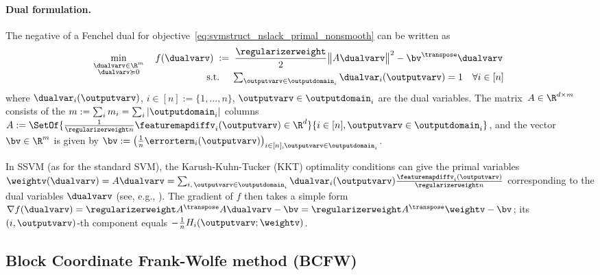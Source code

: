 \documentclass{article}
\begin{document}
\paragraph{Dual formulation.} The negative of a Fenchel dual for objective~\eqref{eq:svmstruct_nslack_primal_nonsmooth} can be written as\vspace{-1mm}
\begin{align}
    \label{eq:svmstruct_nslack_dual} %
    \min_{\substack{ \dualvarv\in\R^{m} \\  \dualvarv \succcurlyeq 0}} \quad  f(\dualvarv) \;:=&  \;\;
    \frac{\regularizerweight}{2}
    \big\| A\dualvarv \big\|^2
    - \bv^\transpose\dualvarv
    \\[-3mm]
    \text{s.t.} \quad &  \;
      \textstyle\sum_{\outputvarv \in \outputdomain_i}  \dualvar_i(\outputvarv) = 1 ~~~\forall i\in[n] \ \notag
\end{align}
where $\dualvar_i(\outputvarv)$, $i\in[n]:=\{1,\ldots,n\}$, $\outputvarv \in \outputdomain_i$ are the dual variables.
The matrix~$A\in\R^{d\times m}$ consists of the $m := \sum_i m_i = \sum_i |\outputdomain_i|$ columns $A := \SetOf{\frac1{\regularizerweight n} \featuremapdiffv_i(\outputvarv) \in\R^d}{i\in[n],\outputvarv \in \outputdomain_i}$, and the vector $\bv \in \R^m$ is given by
$\bv:= \left(\frac1n \errorterm_i(\outputvarv) \right)_{i\in[n],\outputvarv\in\outputdomain_i}$.

In SSVM (as for the standard SVM), the Karush-Kuhn-Tucker (KKT) optimality conditions can give the primal variables~\mbox{$
\weightv(\dualvarv) = A\dualvarv  = \sum_{i,\,\outputvarv \in \outputdomain_i} \dualvar_i(\outputvarv)  \frac{\featuremapdiffv_i(\outputvarv)}{\regularizerweight n}
$} corresponding to the dual variables $\dualvarv$ (see, e.g., \citep[App.~E]{lacosteJulien13bcfw}).
The gradient of $f$ then takes a simple form $\nabla f(\dualvarv) = \regularizerweight A^\transpose A\dualvarv - \bv = \regularizerweight A^\transpose \weightv - \bv$; its \mbox{$(i,\outputvarv)$-th} component equals $-\frac{1}{n} H_i(\outputvarv; \weightv)$.
%

\subsection{Block Coordinate Frank-Wolfe method (BCFW)\label{sec:bcfw}}
\end{document}
